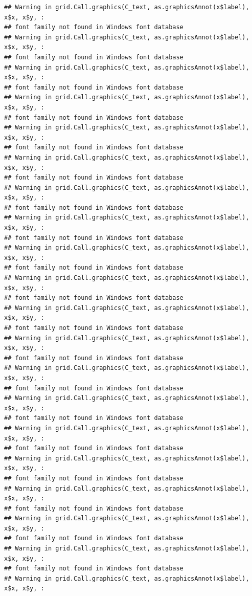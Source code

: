 \documentclass[
]{article}
\begin{document}
\begin{verbatim}
## Warning in grid.Call.graphics(C_text, as.graphicsAnnot(x$label), x$x, x$y, :
## font family not found in Windows font database
## Warning in grid.Call.graphics(C_text, as.graphicsAnnot(x$label), x$x, x$y, :
## font family not found in Windows font database
## Warning in grid.Call.graphics(C_text, as.graphicsAnnot(x$label), x$x, x$y, :
## font family not found in Windows font database
## Warning in grid.Call.graphics(C_text, as.graphicsAnnot(x$label), x$x, x$y, :
## font family not found in Windows font database
## Warning in grid.Call.graphics(C_text, as.graphicsAnnot(x$label), x$x, x$y, :
## font family not found in Windows font database
## Warning in grid.Call.graphics(C_text, as.graphicsAnnot(x$label), x$x, x$y, :
## font family not found in Windows font database
## Warning in grid.Call.graphics(C_text, as.graphicsAnnot(x$label), x$x, x$y, :
## font family not found in Windows font database
## Warning in grid.Call.graphics(C_text, as.graphicsAnnot(x$label), x$x, x$y, :
## font family not found in Windows font database
## Warning in grid.Call.graphics(C_text, as.graphicsAnnot(x$label), x$x, x$y, :
## font family not found in Windows font database
## Warning in grid.Call.graphics(C_text, as.graphicsAnnot(x$label), x$x, x$y, :
## font family not found in Windows font database
## Warning in grid.Call.graphics(C_text, as.graphicsAnnot(x$label), x$x, x$y, :
## font family not found in Windows font database
## Warning in grid.Call.graphics(C_text, as.graphicsAnnot(x$label), x$x, x$y, :
## font family not found in Windows font database
## Warning in grid.Call.graphics(C_text, as.graphicsAnnot(x$label), x$x, x$y, :
## font family not found in Windows font database
## Warning in grid.Call.graphics(C_text, as.graphicsAnnot(x$label), x$x, x$y, :
## font family not found in Windows font database
## Warning in grid.Call.graphics(C_text, as.graphicsAnnot(x$label), x$x, x$y, :
## font family not found in Windows font database
## Warning in grid.Call.graphics(C_text, as.graphicsAnnot(x$label), x$x, x$y, :
## font family not found in Windows font database
## Warning in grid.Call.graphics(C_text, as.graphicsAnnot(x$label), x$x, x$y, :
## font family not found in Windows font database
## Warning in grid.Call.graphics(C_text, as.graphicsAnnot(x$label), x$x, x$y, :
## font family not found in Windows font database
## Warning in grid.Call.graphics(C_text, as.graphicsAnnot(x$label), x$x, x$y, :
## font family not found in Windows font database
## Warning in grid.Call.graphics(C_text, as.graphicsAnnot(x$label), x$x, x$y, :

\end{verbatim}
\end{document}
